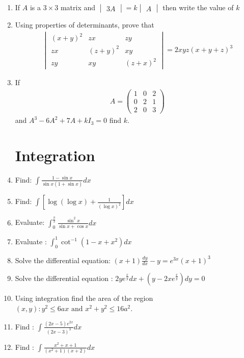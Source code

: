 \documentclass[12pt,-letter paper]{article}
\newcommand{\myvec}[1]{\ensuremath{\begin{pmatrix}#1\end{pmatrix}}}
\newcommand{\mydet}[1]{\ensuremath{\begin{vmatrix}#1\end{vmatrix}}}
\providecommand{\brak}[1]{\ensuremath{\left(#1\right)}}
\providecommand{\sbrak}[1]{\ensuremath{{}\left[#1\right]}}
\providecommand{\brak}[1]{\ensuremath{\left(#1\right)}}
\begin{document}
\begin{enumerate}
	\item If $A$ is a $3\times3$ matrix and $\mydet{3A} = k \mydet{A}$ then write the value of $k$

	\item Using properties of determinants, prove that
	\begin{align*}
		\mydet{(x + y)^2 & zx & zy \\
		zx & (z+y)^2 & xy \\
		zy & xy & (z+x)^2}
		 = 2xyz (x + y + z)^3
	\end{align*}
	
	\item If 
	\begin{align*}
		A = \myvec{1 & 0 & 2\\
		0 & 2 & 1 \\
		2 & 0 & 3}
	\end{align*}
and $A^3-6A^2+7A+kI_3=0$ find $k$.


\section{Integration}
	\item Find: $\int \frac{1- \sin x}{\sin x (1 + \sin x)} dx$

	\item Find: $\int \sbrak{\log (\log x)+ \frac{1}{(\log x)^2}} dx$

	\item Evaluate: $\int_0^\frac{\pi}{2} \frac{\sin^2x}{\sin x + \cos x} dx$

	\item Evaluate : $ \int_0^1 \cot^{-1}\brak{1 - x + x^2} dx$

	\item Solve the differential equation: $(x + 1) \frac{dy}{dx} - y = e^{3x} (x + 1)^3$ 

	\item Solve the differential equation : $2y e^{\frac{x}{y}}dx + \brak{y - 2x e^{\frac{x}{y}}}dy = 0$

	\item Using integration find the area of the region ${(x, y) : y^2 \leq 6ax \text{ and }
 x^2+y^2 \leq 16a^2}$.



	\item Find : $\int \frac{(2x-5)e^{2x}}{(2x-3)^3} dx$

	\item Find : $\int \frac{x^2 +x +1}{(x^2 + 1)(x + 2)} dx$


\end{enumerate}
\end{document}
